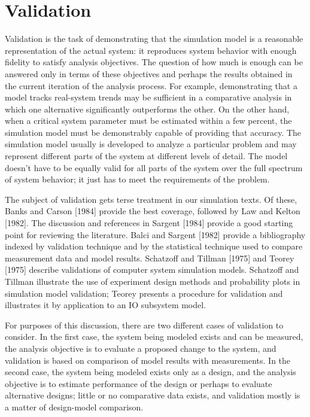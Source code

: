 \section{Validation}
\label{sec:validation}

Validation is the task of demonstrating that the simulation model is a
reasonable representation of the actual system: it reproduces system behavior
with enough fidelity to satisfy analysis objectives. The question of how much
is enough can be answered only in terms of these objectives and perhaps the
results obtained in the current iteration of the analysis process. For
example, demonstrating that a model tracks real-system trends may be
sufficient in a comparative analysis in which one alternative significantly
outperforms the other. On the other hand, when a critical system parameter
must be estimated within a few percent, the simulation model must be
demonstrably capable of providing that accuracy. The simulation model usually
is developed to analyze a particular problem and may represent different parts
of the system at different levels of detail. The model doesn't have to be
equally valid for all parts of the system over the full spectrum of system
behavior; it just has to meet the requirements of the problem.

The subject of validation gets terse treatment in our simulation texts. Of
these, Banks and Carson [1984] provide the best coverage, followed by Law and
Kelton [1982]. The discussion and references in Sargent [1984] provide a good
starting point for reviewing the literature. Balci and Sargent [1982] provide
a bibliography indexed by validation technique and by the statistical
technique used to compare measurement data and model results. Schatzoff and
Tillman [1975] and Teorey [1975] describe validations of computer system
simulation models. Schatzoff and Tillman illustrate the use of experiment
design methods and probability plots in simulation model validation; Teorey
presents a procedure for validation and illustrates it by application to an IO
subsystem model.

For purposes of this discussion, there are two different cases of validation to
consider. In the first case, the system being modeled exists and can be
measured, the analysis objective is to evaluate a proposed change to the
system, and validation is based on comparison of model results with
measurements. In the second case, the system being modeled exists only as a
design, and the analysis objective is to estimate performance of the design or
perhaps to evaluate alternative designs; little or no comparative data exists,
and validation mostly is a matter of design-model comparison.

